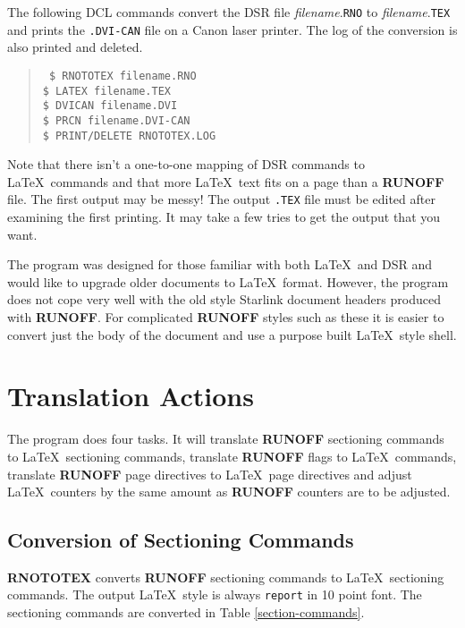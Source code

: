 The following DCL commands convert the DSR file {\it filename}.{\tt RNO} to 
{\it filename}.{\tt TEX} and  prints the {\tt .DVI-CAN} file on a Canon laser
printer. The log of the conversion is also printed and deleted.

\begin{quote}\tt
\$ RNOTOTEX filename.RNO \\ 
\$ LATEX filename.TEX \\
\$ DVICAN filename.DVI \\
\$ PRCN filename.DVI-CAN \\
\$ PRINT/DELETE RNOTOTEX.LOG
\end{quote}

Note that there isn't a one-to-one mapping of DSR commands to \LaTeX\  commands
and that more \LaTeX\ text fits on a page than a {\bf RUNOFF} file. The  first
output may be messy!   The output {\tt .TEX} file must be  edited after examining the first printing.  It may take a few tries to
get the output that you want.

The program was designed for those familiar with both \LaTeX\ and DSR and would
like to upgrade older documents to \LaTeX\ format. However, the program does
not cope very well with the old style Starlink document headers produced with
{\bf RUNOFF}. For complicated {\bf RUNOFF} styles such as these it is easier to
convert just the body of the document and use a purpose built \LaTeX\ style
shell.

\section{Translation Actions}

The program does four tasks.  It will translate {\bf RUNOFF} sectioning
commands to \LaTeX\ sectioning commands, translate {\bf RUNOFF} flags to
\LaTeX\ commands, translate {\bf RUNOFF} page directives to \LaTeX\ page
directives and adjust \LaTeX\ counters by the same amount as {\bf RUNOFF}
counters are to be adjusted.

\subsection{Conversion of Sectioning Commands}

{\bf RNOTOTEX} converts {\bf RUNOFF} sectioning commands to \LaTeX\ sectioning 
commands.  The output \LaTeX\ style is always {\tt report} in 10 point font.
The sectioning commands are converted in Table \ref{section-commands}.


